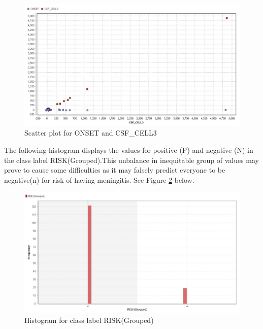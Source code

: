 \begin{figure}[ht]
	\begin{center}
		\advance\leftskip-3cm
		\advance\rightskip-3cm
		\includegraphics[keepaspectratio=true,scale=0.6]{__resources/onset_csf_cell3.jpg}
		\caption{Scatter plot for ONSET and CSF\_CELL3}
		\label{onset}
	\end{center}
\end{figure}

\newpage

The following histogram displays the values for positive (P) and negative (N) in the class label RISK(Grouped).This unbalance in inequitable group of values may prove to cause some difficulties as it may falsely predict everyone to be negative(n) for risk of having meningitis.
See Figure \ref{risk} below.
\begin{figure}[ht]
	\begin{center}
		\advance\leftskip-3cm
		\advance\rightskip-3cm
		\includegraphics[keepaspectratio=true,scale=0.6]{__resources/risk.jpg}
		\caption{Histogram for class label RISK(Grouped)}
		\label{risk}
	\end{center}
\end{figure}

